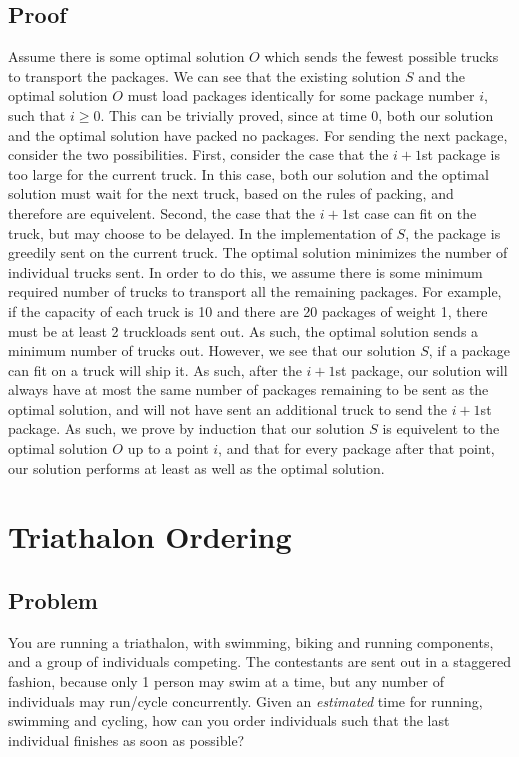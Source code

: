 \documentclass[titlepage]{article}
\numberwithin{equation}{subsection}
\begin{document}
\subsection{Proof}
Assume there is some optimal solution $O$ which sends the fewest possible
trucks to transport the packages. We can see that the existing solution $S$
and the optimal solution $O$ must load packages identically for some
package number $i$, such that $i\geq0$. This can be trivially proved, since
at time 0, both our solution and the optimal solution have packed no packages.
For sending the next package, consider the two possibilities. First, consider
the case that the $i+1$st package is too large for the current truck. In this case,
both our solution and the optimal solution must wait for the next truck,
based on the rules of packing, and therefore are equivelent. Second, the
case that the $i+1$st case can fit on the truck, but may choose to be delayed.
In the implementation of $S$, the package is greedily sent on the current truck.
The optimal solution minimizes the number of individual trucks sent. 
In order to do this, we assume there is some minimum required number of
trucks to transport all the remaining packages. For example, if the capacity
of each truck is 10 and there are 20 packages of weight 1, there must be at least
2 truckloads sent out. As such, the optimal solution sends a minimum number
of trucks out. However, we see that our solution $S$, if a package can fit on
a truck will ship it. As such, after the $i+1$st package, our solution
will always have at most the same number of packages remaining to be sent
as the optimal solution, and will not have sent an additional truck to
send the $i+1$st package. As such, we prove by induction that our solution $S$
is equivelent to the optimal solution $O$ up to a point $i$, and that for
every package after that point, our solution performs at least as well
as the optimal solution.
\section{Triathalon Ordering}
\subsection{Problem}
You are running a triathalon, with swimming, biking and running components,
and a group of individuals competing. The contestants are sent out in
a staggered fashion, because only 1 person may swim at a time, but any
number of individuals may run/cycle concurrently. Given an \textit{estimated}
time for running, swimming and cycling, how can you order individuals such that
the last individual finishes as soon as possible?
\end{document}
